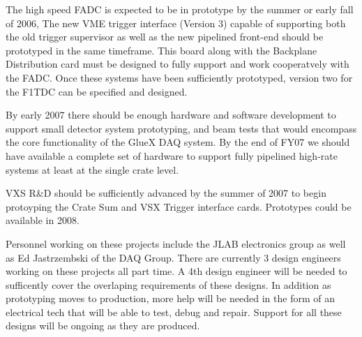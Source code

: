 \documentclass[10pt]{article}
\begin{document}
The high speed FADC is expected to be in prototype by the summer or early fall of 2006,
The new VME trigger interface (Version 3) capable of supporting both the old
trigger supervisor as well as the new pipelined front-end should be prototyped in the
same timeframe. This board along with the Backplane Distribution card must be designed
to fully support and work cooperatvely with the FADC. Once these systems have been 
sufficiently prototyped, version two for the F1TDC can be specified and designed. 

By early 2007 there should be enough hardware and software development to
support small detector system prototyping, and beam tests that would
encompass the core functionality of the GlueX DAQ system. By the end of FY07 we should
have available a complete set of hardware to support fully pipelined high-rate
systems at least at the single crate level.

VXS R\&D should be sufficiently advanced by the summer of 2007 to begin protoyping the
Crate Sum and VSX Trigger interface cards. Prototypes could be available in 2008.

Personnel working on these projects include the JLAB electronics group as well as Ed Jastrzembski
of the DAQ Group. There are currently 3 design engineers working on these projects all part time.
A 4th design engineer will be needed to sufficently cover the overlaping requirements of these
designs. In addition as prototyping moves to production, more help will be needed in
the form of an electrical tech that will be able to test, debug and repair. Support for all
these designs will be ongoing as they are produced.
\end{document}
